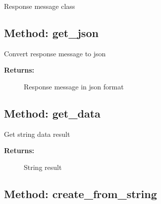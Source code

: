 Response message class

\hypertarget{qconnectbase-utils-method-get_json-91}{%
\subsection{Method: get\_json}\label{qconnectbase-utils-method-get_json-91}}

Convert response message to json

\begin{description}
\item[\textbf{Returns:}]
Response message in json format
\end{description}

\hypertarget{qconnectbase-utils-method-get_data-92}{%
\subsection{Method: get\_data}\label{qconnectbase-utils-method-get_data-92}}

Get string data result

\begin{description}
\item[\textbf{Returns:}]
String result
\end{description}

\hypertarget{qconnectbase-utils-method-create_from_string-93}{%
\subsection{Method:
create\_from\_string}\label{qconnectbase-utils-method-create_from_string-93}}
